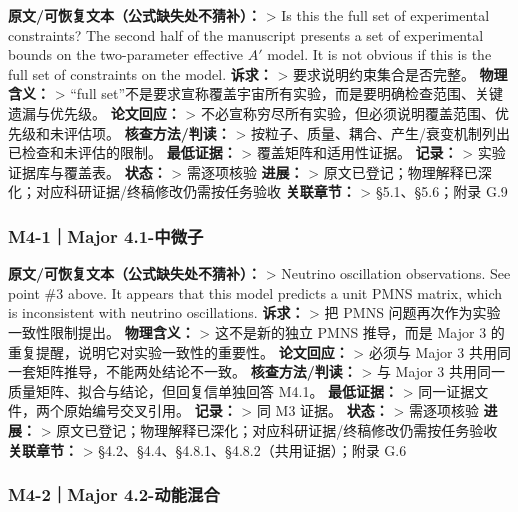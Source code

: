 \documentclass[
  chinese,
  UTF8]{ctexart}
\begin{document}
\textbf{原文/可恢复文本（公式缺失处不猜补）：} \textgreater{} Is this
the full set of experimental constraints? The second half of the
manuscript presents a set of experimental bounds on the two-parameter
effective \(A'\) model. It is not obvious if this is the full set of
constraints on the model. \textbf{诉求：} \textgreater{}
要求说明约束集合是否完整。 \textbf{物理含义：} \textgreater{} ``full
set''不是要求宣称覆盖宇宙所有实验，而是要明确检查范围、关键遗漏与优先级。
\textbf{论文回应：} \textgreater{}
不必宣称穷尽所有实验，但必须说明覆盖范围、优先级和未评估项。
\textbf{核查方法/判读：} \textgreater{}
按粒子、质量、耦合、产生/衰变机制列出已检查和未评估的限制。
\textbf{最低证据：} \textgreater{} 覆盖矩阵和适用性证据。
\textbf{记录：} \textgreater{} 实验证据库与覆盖表。 \textbf{状态：}
\textgreater{} 需逐项核验 \textbf{进展：} \textgreater{}
原文已登记；物理解释已深化；对应科研证据/终稿修改仍需按任务验收
\textbf{关联章节：} \textgreater{} §5.1、§5.6；附录 G.9

\subsubsection{M4-1｜Major
4.1-中微子}\label{m4-1major-4.1-ux4e2dux5faeux5b50}

\textbf{原文/可恢复文本（公式缺失处不猜补）：} \textgreater{} Neutrino
oscillation observations. See point \#3 above. It appears that this
model predicts a unit PMNS matrix, which is inconsistent with neutrino
oscillations. \textbf{诉求：} \textgreater{} 把 PMNS
问题再次作为实验一致性限制提出。 \textbf{物理含义：} \textgreater{}
这不是新的独立 PMNS 推导，而是 Major 3
的重复提醒，说明它对实验一致性的重要性。 \textbf{论文回应：}
\textgreater{} 必须与 Major 3 共用同一套矩阵推导，不能两处结论不一致。
\textbf{核查方法/判读：} \textgreater{} 与 Major 3
共用同一质量矩阵、拟合与结论，但回复信单独回答 M4.1。
\textbf{最低证据：} \textgreater{} 同一证据文件，两个原始编号交叉引用。
\textbf{记录：} \textgreater{} 同 M3 证据。 \textbf{状态：}
\textgreater{} 需逐项核验 \textbf{进展：} \textgreater{}
原文已登记；物理解释已深化；对应科研证据/终稿修改仍需按任务验收
\textbf{关联章节：} \textgreater{}
§4.2、§4.4、§4.8.1、§4.8.2（共用证据）；附录 G.6

\subsubsection{M4-2｜Major
4.2-动能混合}\label{m4-2major-4.2-ux52a8ux80fdux6df7ux5408}
\end{document}
